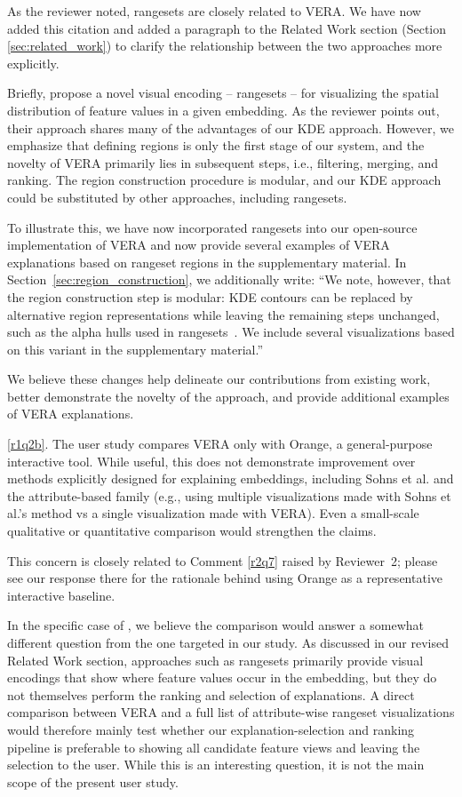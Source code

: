 \documentclass[11pt]{article}
\newcounter{rtaskno}
\newcommand{\rtask}[1]{\refstepcounter{rtaskno}\label{#1}}
\newcommand{\reviewc}[2]{\begin{leftbar}\noindent\rtask{#1}\ref{#1}. #2\end{leftbar}\vspace*{-4mm}}
\newcommand{\answer}[1]{\noindent #1\par\vspace{2mm}}
\newlength{\leftbarwidth}
\newlength{\leftbarsep}
\renewenvironment{leftbar}{%
    \def\FrameCommand{{\color{black}{\vrule width \leftbarwidth\relax\hspace {\leftbarsep}}}}%
    \MakeFramed {\advance \hsize -\width \FrameRestore }%
}{\endMakeFramed}
\begin{document}
\answer{%
As the reviewer noted, rangesets are closely related to VERA. We have now added this citation and added a paragraph to the Related Work section (Section \ref{sec:related_work}) to clarify the relationship between the two approaches more explicitly.

Briefly, \citet{Sohns2022} propose a novel visual encoding -- rangesets -- for visualizing the spatial distribution of feature values in a given embedding. As the reviewer points out, their approach shares many of the advantages of our KDE approach.
However, we emphasize that defining regions is only the first stage of our system, and the novelty of VERA primarily lies in subsequent steps, i.e., filtering, merging, and ranking.
The region construction procedure is modular, and our KDE approach could be substituted by other approaches, including rangesets.

To illustrate this, we have now incorporated rangesets into our open-source implementation of VERA and now provide several examples of VERA explanations based on rangeset regions in the supplementary material.
In Section~\ref{sec:region_construction}, we additionally write: ``We note, however, that the region construction step is modular: KDE contours can be replaced by alternative region representations while leaving the remaining steps unchanged, such as the alpha hulls used in rangesets~\citep{Sohns2022}. We include several visualizations based on this variant in the supplementary material.''

We believe these changes help delineate our contributions from existing work, better demonstrate the novelty of the approach, and provide additional examples of VERA explanations.
}


\reviewc{r1q2b}{%
The user study compares VERA only with Orange, a general-purpose interactive tool. While useful, this does not demonstrate improvement over methods explicitly designed for explaining embeddings, including Sohns et al. and the attribute-based family (e.g., using multiple visualizations made with Sohns et al.'s method vs a single visualization made with VERA). Even a small-scale qualitative or quantitative comparison would strengthen the claims.}

\answer{%
This concern is closely related to Comment \ref{r2q7} raised by Reviewer~2; please see our response there for the rationale behind using Orange as a representative interactive baseline.

In the specific case of \citep{Sohns2022}, we believe the comparison would answer a somewhat different question from the one targeted in our study. As discussed in our revised Related Work section, approaches such as rangesets primarily provide visual encodings that show where feature values occur in the embedding, but they do not themselves perform the ranking and selection of explanations. A direct comparison between VERA and a full list of attribute-wise rangeset visualizations would therefore mainly test whether our explanation-selection and ranking pipeline is preferable to showing all candidate feature views and leaving the selection to the user. While this is an interesting question, it is not the main scope of the present user study.
}
\end{document}
